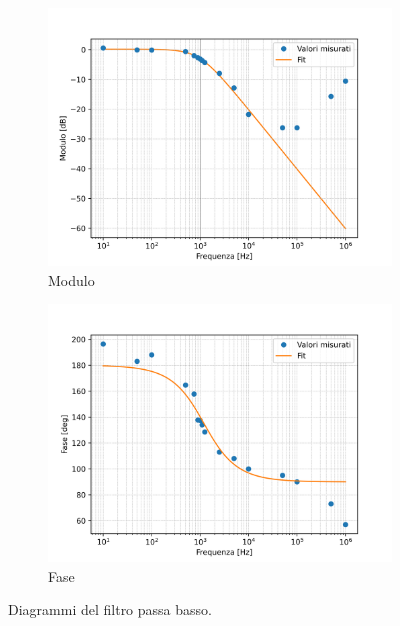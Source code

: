 \documentclass[a4paper,12pt]{article}
\begin{document}
\begin{figure}[h]
    \centering
    \begin{subfigure}{0.49 \linewidth}
        \includegraphics[width = 1 \linewidth]{immagini/modulo_filtro_passa_basso.png}
        \caption{Modulo}
        \label{fig:modulo_filtro_passa_basso}
    \end{subfigure}
    \begin{subfigure}{0.49 \linewidth}
        \includegraphics[width = 1 \linewidth]{immagini/fase_filtro_passa_basso.png}
        \caption{Fase}
        \label{fig:fase_filtro_passa_basso}
    \end{subfigure}
    \caption{Diagrammi del filtro passa basso.}
\end{figure}
\end{document}
